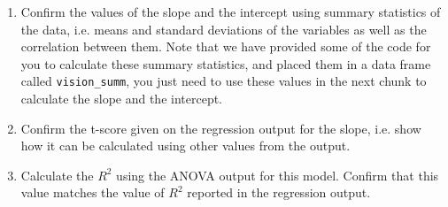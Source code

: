 \documentclass[11pt]{article}
\begin{document}
\begin{enumerate}

\item Confirm the values of the slope and the intercept using summary statistics of the data, i.e. means and standard deviations of the 
variables as well as the correlation between them.  Note that we have provided some of the code for you to calculate these summary statistics, and placed them in a data frame called \texttt{vision\_summ}, you just need to use these values in the next chunk to calculate the slope and the intercept.

\item Confirm the t-score given on the regression output for the slope, i.e. show how it can be calculated using other values from the output.

\item Calculate the $R^2$ using the ANOVA output for this model. Confirm that this value matches the value of $R^2$ reported 
in the regression output.

\end{enumerate}
\end{document}
